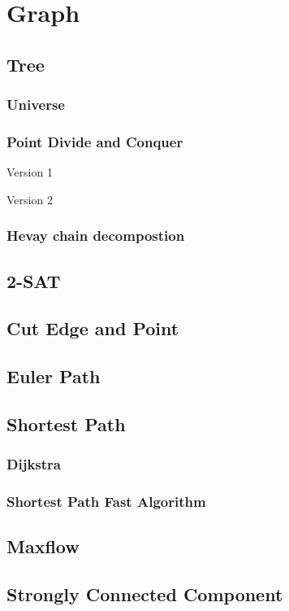 \section{Graph}

\subsection{Tree}
\subsubsection{Universe}


\subsubsection{Point Divide and Conquer}

Version 1


Version 2


\subsubsection{Hevay chain decompostion}


\subsection{2-SAT}


\subsection{Cut Edge and Point}


\subsection{Euler Path}


\subsection{Shortest Path}
\subsubsection{Dijkstra}

\subsubsection{Shortest Path Fast Algorithm}


\subsection{Maxflow}


\subsection{Strongly Connected Component}


